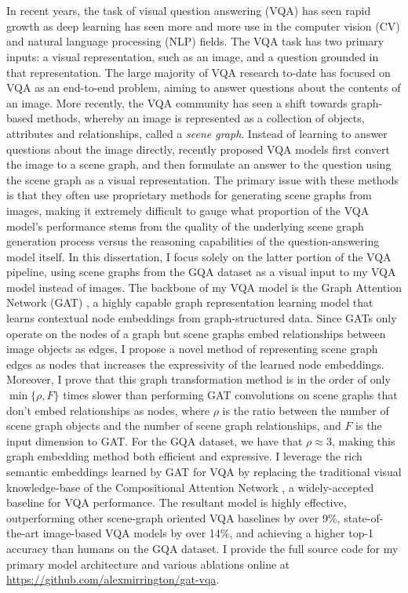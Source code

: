 \chapter*{}

In recent years, the task of visual question answering (VQA) has seen rapid growth as deep learning has seen more and more use in the computer vision (CV) and natural language processing (NLP) fields. The VQA task has two primary inputs: a visual representation, such as an image, and a question grounded in that representation. The large majority of VQA research to-date has focused on VQA as an end-to-end problem, aiming to answer questions about the contents of an image. More recently, the VQA community has seen a shift towards graph-based methods, whereby an image is represented as a collection of objects, attributes and relationships, called a \textit{scene graph}. Instead of learning to answer questions about the image directly, recently proposed VQA models first convert the image to a scene graph, and then formulate an answer to the question using the scene graph as a visual representation. The primary issue with these methods is that they often use proprietary methods for generating scene graphs from images, making it extremely difficult to gauge what proportion of the VQA model's performance stems from the quality of the underlying scene graph generation process versus the reasoning capabilities of the question-answering model itself. In this dissertation, I focus solely on the latter portion of the VQA pipeline, using scene graphs from the GQA dataset \cite{hudson2019gqa} as a visual input to my VQA model instead of images. The backbone of my VQA model is the Graph Attention Network (GAT) \cite{velivckovic2017graph}, a highly capable graph representation learning model that learns contextual node embeddings from graph-structured data. Since GATs only operate on the nodes of a graph but scene graphs embed relationships between image objects as edges, I propose a novel method of representing scene graph edges as nodes that increases the expressivity of the learned node embeddings. Moreover, I prove that this graph transformation method is in the order of only \(\min\{\rho, F\}\) times slower than performing GAT convolutions on scene graphs that don't embed relationships as nodes, where \(\rho\) is the ratio between the number of scene graph objects and the number of scene graph relationships, and \(F\) is the input dimension to GAT. For the GQA dataset, we have that \(\rho \approx 3\), making this graph embedding method both efficient and expressive. I leverage the rich semantic embeddings learned by GAT for VQA by replacing the traditional visual knowledge-base of the Compositional Attention Network \cite{hudson2018compositional}, a widely-accepted baseline for VQA performance. The resultant model is highly effective, outperforming other scene-graph oriented VQA baselines by over 9\%, state-of-the-art image-based VQA models by over 14\%, and achieving a higher top-1 accuracy than humans on the GQA dataset. I provide the full source code for my primary model architecture and various ablations online at \url{https://github.com/alexmirrington/gat-vqa}.


